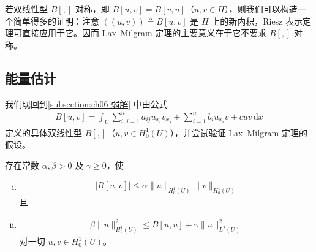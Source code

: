 \documentclass[../../main.tex]{subfiles}
\begin{document}
\begin{remark}\label{remark:ch06-LaxMilgram对称}
若双线性型 $B[,]$ 对称，即 $B[u,v]=B[v,u]$（$u,v\in H$），则我们可以构造一个简单得多的证明：注意 $((u,v))\triangleq B[u,v]$ 是 $H$ 上的新内积，Riesz 表示定理可直接应用于它。因而 Lax--Milgram 定理的主要意义在于它不要求 $B[,]$ 对称。
\end{remark}

\subsection{能量估计}\label{subsection:ch06-能量估计}

我们现回到\cref{subsection:ch06-弱解} 中由公式
\begin{align*}
B[u,v]=\int_{U}\sum_{i,j=1}^{n}a_{ij}u_{x_{i}}v_{x_{j}}+\sum_{i=1}^{n}b_{i}u_{x_{i}}v+cuv\,\mathrm{d}x
\end{align*}
定义的具体双线性型 $B[,]$（$u,v\in H^{1}_{0}(U)$），并尝试验证 Lax--Milgram 定理的假设。

\begin{theorem}[能量估计]\label{theorem:ch06-能量估计}存在常数 $\alpha,\beta>0$ 及 $\gamma\geqslant 0$，使
\begin{enumerate}[(i)]
\item
\begin{align*}
|B[u,v]|\leqslant\alpha\|u\|_{H^{1}_{0}(U)}\|v\|_{H^{1}_{0}(U)}
\end{align*}
且
\item
\begin{align*}
\beta\|u\|_{H^{1}_{0}(U)}^{2}\leqslant B[u,u]+\gamma\|u\|_{L^{2}(U)}^{2}
\end{align*}
对一切 $u,v\in H^{1}_{0}(U)$。
\end{enumerate}
\end{theorem}
\end{document}
